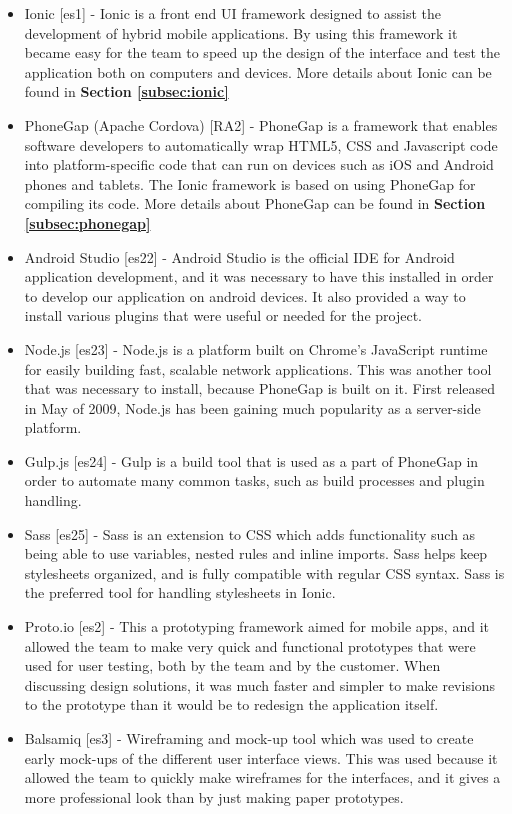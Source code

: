\begin{itemize}
	\item Ionic [es1] - Ionic is a front end UI framework designed to assist the development of hybrid mobile applications. By using this framework it became easy for the team to speed up the design of the interface and test the application both on computers and devices. More details about Ionic can be found in \textbf{Section \ref{subsec:ionic}}
	\item PhoneGap (Apache Cordova) [RA2] - PhoneGap is a framework that enables software developers to automatically wrap HTML5, CSS and Javascript code into platform-specific code that can run on devices such as iOS and Android phones and tablets. The Ionic framework is based on using PhoneGap for compiling its code. More details about PhoneGap can be found in \textbf{Section \ref{subsec:phonegap}}
	\item Android Studio [es22] - Android Studio is the official IDE for Android application development, and it was necessary to have this installed in order to develop our application on android devices. It also provided a way to install various plugins that were useful or needed for the project.
	\item Node.js [es23] - Node.js is a platform built on Chrome’s JavaScript runtime for easily building fast, scalable network applications. This was another tool that was necessary to install, because PhoneGap is built on it. First released in May of 2009, Node.js has been gaining much popularity as a server-side platform.
	\item Gulp.js [es24] - Gulp is a build tool that is used as a part of PhoneGap in order to automate many common tasks, such as build processes and plugin handling.
	\item Sass [es25] - Sass is an extension to CSS which adds functionality such as being able to use variables, nested rules and inline imports. Sass helps keep stylesheets organized, and is fully compatible with regular CSS syntax. Sass is the preferred tool for handling stylesheets in Ionic.
	\item Proto.io [es2] - This a prototyping framework aimed for mobile apps, and it allowed the team to make very quick and functional prototypes that were used for user testing, both by the team and by the customer. When discussing design solutions, it was much faster and simpler to make revisions to the prototype than it would be to redesign the application itself. 
	\item Balsamiq [es3] - Wireframing and mock-up tool which was used to create early mock-ups of the different user interface views. This was used because it allowed the team to quickly make wireframes for the interfaces, and it gives a more professional look than by  just making paper prototypes.

\end{itemize}
